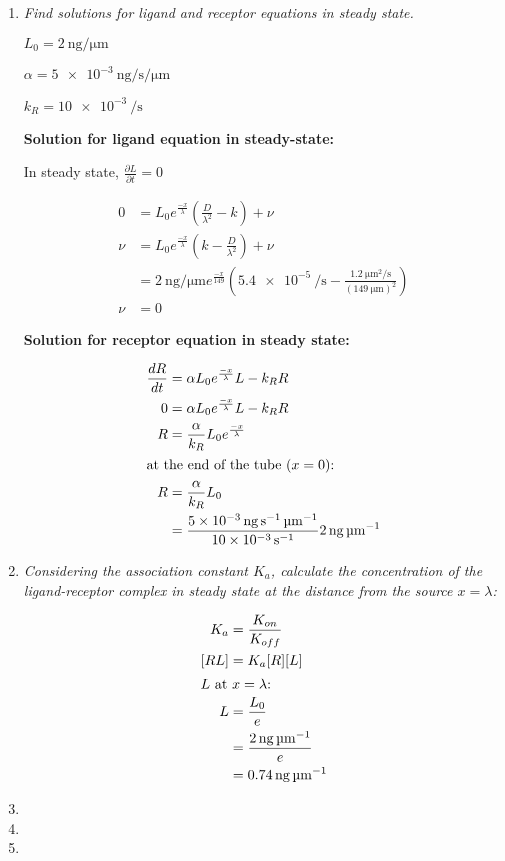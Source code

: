 \documentclass{article} %
\begin{document}
\begin{enumerate}
  \item \textit{Find solutions for ligand and receptor equations in steady state.}

      $L_0=\SI{2}{\nano\g\per\micro\m}$

      $\alpha = \SI{5e-3}{\nano\g\per\s\per\micro\m}$

      $k_R= \SI{10e-3}{\per\s}$


      \textbf{Solution for ligand equation in steady-state:}

      In steady state, $\frac{\partial L}{\partial t} = 0$  

      \begin{align*}
        0 &= L_0e^{\frac{-x}{\lambda}}\left(\frac{D}{\lambda^2} -k \right) + \nu \\
        \nu &= L_0e^{\frac{-x}{\lambda}}\left(k - \frac{D}{\lambda^2} \right) + \nu \\
          &= \SI{2}{\nano\g\per\micro\m}e^{\frac{-x}{149}} \left (\SI{5.4e-5}{\per\s} - \frac{\SI{1.2}{\micro\m^2\per\s}}{(\SI{149}{\micro\m})^2} \right ) \\
          \nu &= 0
      \end{align*}

      \textbf{Solution for receptor equation in steady state:}

      \begin{align*}
        \frac{dR}{dt} &= \alpha L_0 e^{\frac{-x}{\lambda}} L-k_R R \\
        0 &= \alpha L_0 e^{\frac{-x}{\lambda}} L-k_R R \\
        R &= \frac{\alpha}{k_R} L_0e^{\frac{-x}{\lambda}} \\
        \intertext{at the end of the tube ($x=0$):}
        R &= \frac{\alpha}{k_R}L_0 \\
                      &= \frac{\SI{5e-3}{\nano\gram\per\s\per\micro\m}}{\SI{10e-3}{\per\s}} \SI{2}{\nano\gram\per\micro\m} \\
      \end{align*}
        
    \item \textit{Considering the association constant $K_a$, calculate the concentration of the ligand-receptor complex in steady state at the distance from the source $x=\lambda$:}

      \begin{align*}
        K_a &= \frac{K_{on}}{K_{off}} \\
        [RL] &= K_a[R][L] \\
        \intertext{$L$ at $x=\lambda$:}
        L &= \frac{L_0}{e} \\ 
            &= \frac{\SI{2}{\nano\g\per\micro\m}}{e} \\
            &= \SI{0.74}{\nano\g\per\micro\m}
      \end{align*}
    \item 
    \item 
    \item 
\end{enumerate}
\end{document}
